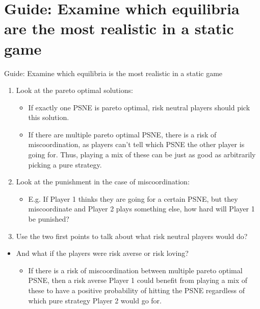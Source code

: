 \section{Guide: Examine which equilibria are the most realistic in a static game}

\begin{frame}{Guide: Examine which equilibria is the most realistic in a static game}
  \begin{multicols}{2}
    \begin{enumerate}
      \item Look at the pareto optimal solutions:\\
      \begin{itemize}
        \normalsize
          \item[a.] If exactly one PSNE is pareto optimal, risk neutral players should pick this solution.
          \item[b.] If there are multiple pareto optimal PSNE, there is a risk of miscoordination, as players can't tell which PSNE the other player is going for. Thus, playing a mix of these can be just as good as arbitrarily picking a pure strategy.
      \end{itemize}
      \item Look at the punishment in the case of miscoordination:\\
      \begin{itemize}
        \normalsize
          \item E.g. If Player 1 thinks they are going for a certain PSNE, but they miscoordinate and Player 2 plays something else, how hard will Player 1 be punished?
      \end{itemize}
      \item Use the two first points to talk about what risk neutral players would do?
    \end{enumerate}
    \vfill\null \columnbreak
    \begin{itemize}
      \item[4.] And what if the players were risk averse or risk loving?\\
      \begin{itemize}
        \normalsize
          \item[ad. 1] If there is a risk of miscoordination between multiple pareto optimal PSNE, then a risk averse Player 1 could benefit from playing a mix of these to have a positive probability of hitting the PSNE regardless of which pure strategy Player 2 would go for.

\end{itemize}
\end{itemize}
\end{multicols}
\end{frame}
